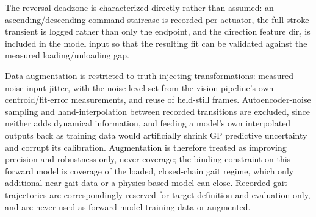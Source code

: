 The reversal deadzone is characterized directly rather than assumed: an ascending/descending command staircase is recorded per actuator, the full stroke transient is logged rather than only the endpoint, and the direction feature $\mathrm{dir}_t$ is included in the model input so that the resulting fit can be validated against the measured loading/unloading gap.

Data augmentation is restricted to truth-injecting transformations: measured-noise input jitter, with the noise level set from the vision pipeline's own centroid/fit-error measurements, and reuse of held-still frames. Autoencoder-noise sampling and hand-interpolation between recorded transitions are excluded, since neither adds dynamical information, and feeding a model's own interpolated outputs back as training data would artificially shrink GP predictive uncertainty and corrupt its calibration. Augmentation is therefore treated as improving precision and robustness only, never coverage; the binding constraint on this forward model is coverage of the loaded, closed-chain gait regime, which only additional near-gait data or a physics-based model can close. Recorded gait trajectories are correspondingly reserved for target definition and evaluation only, and are never used as forward-model training data or augmented.
